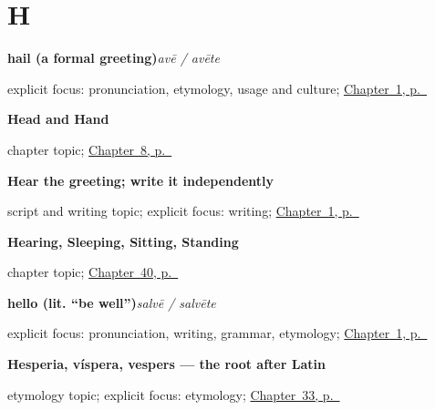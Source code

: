 \section*{H}

\noindent\begin{minipage}[t]{\linewidth}
\raggedright
\textbf{hail (a formal greeting)}\enspace\emph{avē / avēte}\par
\footnotesize explicit focus: pronunciation, etymology, usage and culture; \hyperref[ch:greetings]{Chapter~1, p.~\pageref*{ch:greetings}}
\end{minipage}\par\smallskip

\noindent\begin{minipage}[t]{\linewidth}
\raggedright
\textbf{Head and Hand}\par
\footnotesize chapter topic; \hyperref[ch:la-head-and-hand]{Chapter~8, p.~\pageref*{ch:la-head-and-hand}}
\end{minipage}\par\smallskip

\noindent\begin{minipage}[t]{\linewidth}
\raggedright
\textbf{Hear the greeting; write it independently}\par
\footnotesize script and writing topic; explicit focus: writing; \hyperref[ch:greetings]{Chapter~1, p.~\pageref*{ch:greetings}}
\end{minipage}\par\smallskip

\noindent\begin{minipage}[t]{\linewidth}
\raggedright
\textbf{Hearing, Sleeping, Sitting, Standing}\par
\footnotesize chapter topic; \hyperref[ch:la-sense-and-posture-verbs]{Chapter~40, p.~\pageref*{ch:la-sense-and-posture-verbs}}
\end{minipage}\par\smallskip

\noindent\begin{minipage}[t]{\linewidth}
\raggedright
\textbf{hello (lit. \textquotedblleft{}be well\textquotedblright{})}\enspace\emph{salvē / salvēte}\par
\footnotesize explicit focus: pronunciation, writing, grammar, etymology; \hyperref[ch:greetings]{Chapter~1, p.~\pageref*{ch:greetings}}
\end{minipage}\par\smallskip

\noindent\begin{minipage}[t]{\linewidth}
\raggedright
\textbf{Hesperia, víspera, vespers — the root after Latin}\par
\footnotesize etymology topic; explicit focus: etymology; \hyperref[ch:la-evening]{Chapter~33, p.~\pageref*{ch:la-evening}}
\end{minipage}\par\smallskip

